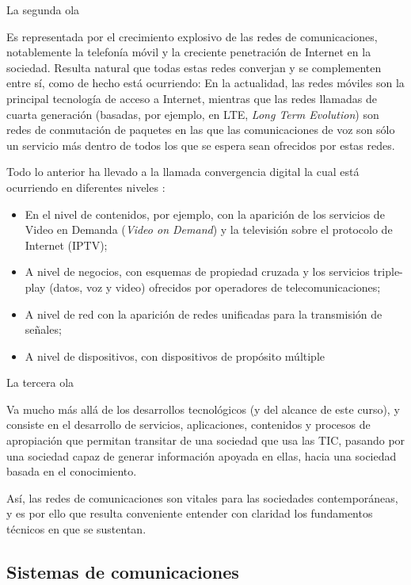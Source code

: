 \documentclass[
]{book}
\providecommand{\tightlist}{%
  \setlength{\itemsep}{0pt}\setlength{\parskip}{0pt}}
\begin{document}
La segunda ola

Es representada por el crecimiento explosivo de las redes de comunicaciones, notablemente la telefonía móvil y la creciente penetración de Internet en la sociedad. Resulta natural que todas estas redes converjan y se complementen entre sí, como de hecho está ocurriendo: En la actualidad, las redes móviles son la principal tecnología de acceso a Internet, mientras que las redes llamadas de cuarta generación (basadas, por ejemplo, en LTE, \emph{Long Term Evolution}) son redes de conmutación de paquetes en las que las comunicaciones de voz son sólo un servicio más dentro de todos los que se espera sean ofrecidos por estas redes.

Todo lo anterior ha llevado a la llamada convergencia digital la cual está ocurriendo en diferentes niveles \citep{OECD:BS}:

\begin{itemize}
\tightlist
\item
  En el nivel de contenidos, por ejemplo, con la aparición de los servicios de Video en Demanda (\emph{Video on Demand}) y la televisión sobre el protocolo de Internet (IPTV);
\item
  A nivel de negocios, con esquemas de propiedad cruzada y los servicios triple-play (datos, voz y video) ofrecidos por operadores de telecomunicaciones;
\item
  A nivel de red con la aparición de redes unificadas para la transmisión de señales;
\item
  A nivel de dispositivos, con dispositivos de propósito múltiple
\end{itemize}

La tercera ola

Va mucho más allá de los desarrollos tecnológicos (y del alcance de este curso), y consiste en el desarrollo de servicios, aplicaciones, contenidos y procesos de apropiación que permitan transitar de una sociedad que usa las TIC, pasando por una sociedad capaz de generar información apoyada en ellas, hacia una sociedad basada en el conocimiento.

Así, las redes de comunicaciones son vitales para las sociedades contemporáneas, y es por ello que resulta conveniente entender con claridad los fundamentos técnicos en que se sustentan.

\hypertarget{sistemas-de-comunicaciones}{%
\subsection{Sistemas de comunicaciones}\label{sistemas-de-comunicaciones}}
\end{document}
